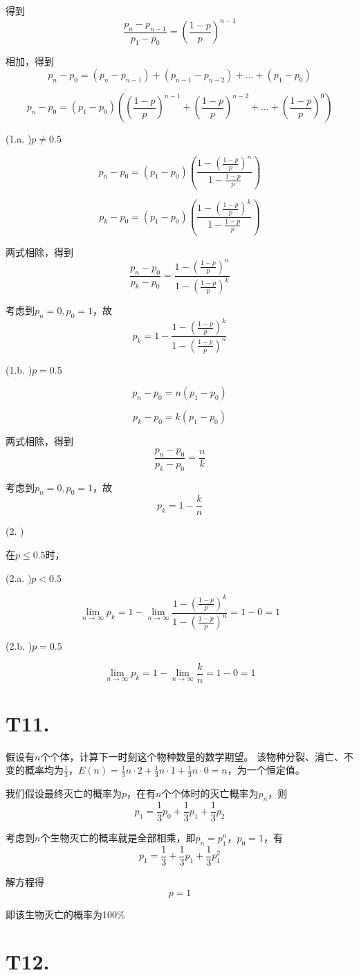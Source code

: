 \documentclass{article}
\begin{document}
得到$$\frac{p_n-p_{n-1}}{p_1-p_0}=(\frac{1-p}{p})^{n-1}$$

相加，得到$$p_n-p_0=(p_n-p_{n-1})+(p_{n-1}-p_{n-2})+...+(p_1-p_0)$$

$$p_n-p_0=(p_1-p_0)((\frac{1-p}{p})^{n-1}+(\frac{1-p}{p})^{n-2}+...+(\frac{1-p}{p})^{0})$$

(1.a. )$p\neq0.5$

$$p_n-p_0=(p_1-p_0)(\frac{1-(\frac{1-p}{p})^n}{1-\frac{1-p}{p}})$$

$$p_k-p_0=(p_1-p_0)(\frac{1-(\frac{1-p}{p})^k}{1-\frac{1-p}{p}})$$

两式相除，得到$$\frac{p_n-p_0}{p_k-p_0}=\frac{1-(\frac{1-p}{p})^n}{1-(\frac{1-p}{p})^k}$$

考虑到$p_{n}=0,p_0=1$，故$$p_k=1-\frac{1-(\frac{1-p}{p})^k}{1-(\frac{1-p}{p})^n}$$

(1.b. )$p=0.5$

$$p_n-p_0=n(p_1-p_0)$$

$$p_k-p_0=k(p_1-p_0)$$

两式相除，得到$$\frac{p_n-p_0}{p_k-p_0}=\frac{n}{k}$$

考虑到$p_{n}=0,p_0=1$，故$$p_k=1-\frac{k}{n}$$

(2. )

在$p\leq0.5$时，

(2.a. )$p<0.5$

$$\lim_{n\to\infty}p_k=1-\lim_{n\to\infty}\frac{1-(\frac{1-p}{p})^k}{1-(\frac{1-p}{p})^n}=1-0=1$$

(2.b. )$p=0.5$

$$\lim_{n\to\infty}p_k=1-\lim_{n\to\infty}\frac{k}{n}=1-0=1$$

\section*{T11. }

假设有$n$个个体，计算下一时刻这个物种数量的数学期望。
该物种分裂、消亡、不变的概率均为$\frac{1}{3}$，$E(n)=\frac{1}{3}n\cdot 2+\frac{1}{3}n\cdot 1+\frac{1}{3}n\cdot 0=n$，为一个恒定值。

我们假设最终灭亡的概率为$p$，在有$n$个个体时的灭亡概率为$p_n$，则$$p_1=\frac{1}{3}p_0+\frac{1}{3}p_1+\frac{1}{3}p_2$$

考虑到$n$个生物灭亡的概率就是全部相乘，即$p_n=p_1^n$，$p_0=1$，有$$p_1=\frac{1}{3}+\frac{1}{3}p_1+\frac{1}{3}p_1^2$$

解方程得$$p=1$$

即该生物灭亡的概率为100\%

\section*{T12. }
\end{document}
